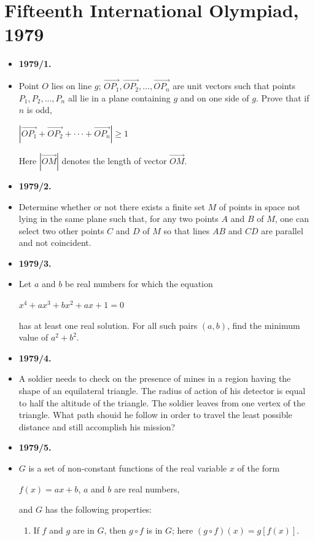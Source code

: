 \documentclass[a4paper,12pt]{article}
\begin{document}
\section*{\textbf{\Large Fifteenth International Olympiad, 1979}}
\begin{itemize}[label={},leftmargin=0pt]
\item \textbf{\large 1979/1.}
\item Point $O$ lies on line $g$; $\vec{OP_1}, \vec{OP_2}, ..., \vec{OP_n}$ are unit vectors such that points $P_1, P_2, ..., P_n$ all lie in a plane containing $g$ and on one side of $g$. Prove that if $n$ is odd,
	\begin{center}
		$|\vec{OP_1} +\vec{OP_2} + \cdot \cdot \cdot + \vec{OP_n}| \geq 1$
	\end{center}
		Here $|\vec{OM}|$ denotes the length of vector $\vec{OM}$.
\item \textbf{\large 1979/2.}
\item Determine whether or not there exists a finite set $M$ of points in space not lying in the same plane such that, for any two points $A$ and $B$ of $M$, one can select two other points $C$ and $D$ of $M$ so that lines $AB$ and $CD$ are parallel and not coincident.
\item \textbf{\large 1979/3.}
\item Let $a$ and $b$ be real numbers for which the equation
	\begin{center}
		$x^4 + ax^3 + bx^2 + ax + 1 = 0$
	\end{center}
has at least one real solution. For all such pairs $(a, b)$, find the minimum value of $a^2 + b^2$.
\item \textbf{\large 1979/4.}
\item A soldier needs to check on the presence of mines in a region having the shape of an equilateral triangle. The radius of action of his detector is equal to half the altitude of the triangle. The soldier leaves from one vertex of the triangle. What path shouid he follow in order to travel the least possible distance and still accomplish his mission?
\item \textbf{\large 1979/5.}
\item $G$ is a set of non-constant functions of the real variable $x$ of the form
	\begin{center}
		$f(x) = ax + b$, $a$ and $b$ are real numbers,
	\end{center}
and $G$ has the following properties:
\begin{enumerate}[label=(\alph*)]
	\item If $f$ and $g$ are in $G$, then $g \circ f$ is in $G$; here $(g \circ f)(x) = g[f(x)]$.

\end{enumerate}
\end{itemize}
\end{document}
